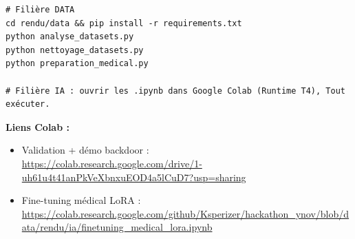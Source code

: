 \documentclass[11pt,a4paper]{article}
\begin{document}
\begin{verbatim}
# Filière DATA
cd rendu/data && pip install -r requirements.txt
python analyse_datasets.py
python nettoyage_datasets.py
python preparation_medical.py

# Filière IA : ouvrir les .ipynb dans Google Colab (Runtime T4), Tout exécuter.
\end{verbatim}

\noindent\textbf{Liens Colab :}
\begin{itemize}[leftmargin=1.4em,itemsep=1pt]
  \item Validation + démo backdoor : \\ \url{https://colab.research.google.com/drive/1-uh61u4t41anPkVeXbnxuEOD4a5lCuD7?usp=sharing}
  \item Fine-tuning médical LoRA : \\ \url{https://colab.research.google.com/github/Ksperizer/hackathon_ynov/blob/data/rendu/ia/finetuning_medical_lora.ipynb}
\end{itemize}
\end{document}
